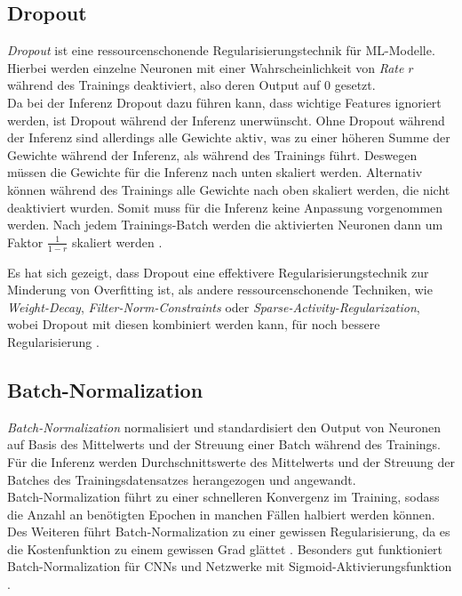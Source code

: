 \subsection{Dropout}

\textit{Dropout} ist eine ressourcenschonende Regularisierungstechnik für \ac{ML}-Modelle. 
Hierbei werden einzelne Neuronen mit einer Wahrscheinlichkeit von \textit{Rate} $r$ während des Trainings 
deaktiviert, also deren Output auf $0$ gesetzt.\\ 
Da bei der Inferenz Dropout dazu führen kann, 
dass wichtige Features ignoriert werden, ist Dropout während der Inferenz unerwünscht. Ohne Dropout während der 
Inferenz sind allerdings alle Gewichte aktiv, was zu einer höheren Summe der Gewichte während der Inferenz, 
als während des Trainings führt. Deswegen müssen die Gewichte für die Inferenz nach unten skaliert werden. 
Alternativ können während des Trainings alle Gewichte nach oben skaliert werden, die nicht deaktiviert wurden. 
Somit muss für die Inferenz keine Anpassung vorgenommen werden. Nach jedem Trainings-Batch werden die aktivierten 
Neuronen dann um Faktor $\frac{1}{1-r}$ skaliert werden \cites[S.~255--258]{Goodfellow.2016}{NitishSrivastava.2014}.

Es hat sich gezeigt, dass Dropout eine effektivere Regularisierungstechnik zur Minderung von Overfitting ist, 
als andere ressourcenschonende Techniken, wie \textit{Weight-Decay}, \textit{Filter-Norm-Constraints} oder 
\textit{Sparse-Activity-Regularization}, wobei Dropout mit diesen kombiniert werden kann, für noch bessere 
Regularisierung \cites[S.~265]{Goodfellow.2016}.

\subsection{Batch-Normalization}

\textit{Batch-Normalization} normalisiert und standardisiert den Output von Neuronen auf Basis des Mittelwerts 
und der Streuung einer Batch während des Trainings. Für die Inferenz werden Durchschnittswerte 
des Mittelwerts und der Streuung der Batches des Trainingsdatensatzes herangezogen und angewandt. \\
Batch-Normalization führt zu einer schnelleren Konvergenz im Training, 
sodass die Anzahl an benötigten Epochen in manchen Fällen halbiert werden können. Des Weiteren führt 
Batch-Normalization zu einer gewissen Regularisierung, da es die Kostenfunktion zu einem gewissen Grad glättet 
\cites[S.~317--320]{Goodfellow.2016}{Ioffe.11022015}.
Besonders gut funktioniert Batch-Normalization für \acp{CNN} und Netzwerke mit Sigmoid-Aktivierungsfunktion
\cites[S.~425]{Goodfellow.2016}.


